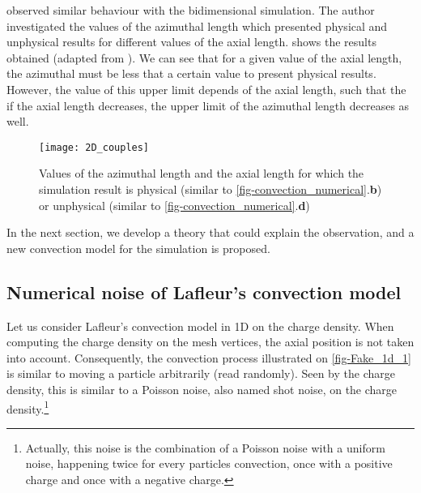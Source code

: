     \FloatBarrier
    \citet{croes2017} observed similar behaviour with the bidimensional  simulation.
    The author investigated the values of the azimuthal length which presented physical and unphysical results
    for different values of the axial length.
     shows the results obtained (adapted from \citep{croes2017}).
    We can see that for a given value of the axial length, the azimuthal must be less that a certain value to present physical results.
    However, the value of this upper limit depends of the axial length, such that the if the axial length decreases, the upper limit of the azimuthal length decreases as well.

    \begin{figure}[hbtp]
      \centering
      \texttt{[image: 2D\_couples]}
      \caption{Values of the azimuthal length and the axial length for which the simulation result is physical (similar to \cref{fig-convection_numerical}.{\bf b}) or unphysical  (similar to \cref{fig-convection_numerical}.{\bf d}) }
      \label{fig-couplesCroes}
    \end{figure}

    In the next section, we develop a theory that could explain the observation, and a new convection model for the simulation is proposed.

  \subsection{Numerical noise of Lafleur's convection model}

    Let us consider Lafleur's convection model in \ac{1D} on the charge density.
    When computing the charge density on the mesh vertices, the axial position is not taken into account.
    Consequently, the convection process illustrated on \cref{fig-Fake_1d_1} is similar to moving a particle arbitrarily (read randomly).
    Seen by the charge density, this is similar to a Poisson noise, also named shot noise, on the charge density.\footnote{Actually, this noise is the combination of a Poisson noise with a uniform noise, happening twice for every particles convection, once with a positive charge and once with a negative charge.}


